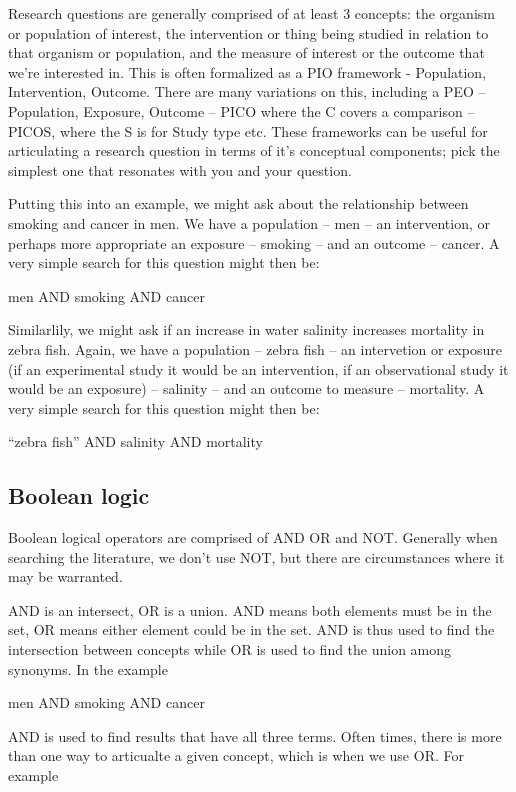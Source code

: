 \documentclass[
]{book}
\begin{document}
Research questions are generally comprised of at least 3 concepts: the organism or population of interest, the intervention or thing being studied in relation to that organism or population, and the measure of interest or the outcome that we're interested in. This is often formalized as a PIO framework - Population, Intervention, Outcome. There are many variations on this, including a PEO -- Population, Exposure, Outcome -- PICO where the C covers a comparison -- PICOS, where the S is for Study type etc. These frameworks can be useful for articulating a research question in terms of it's conceptual components; pick the simplest one that resonates with you and your question.

Putting this into an example, we might ask about the relationship between smoking and cancer in men. We have a population -- men -- an intervention, or perhaps more appropriate an exposure -- smoking -- and an outcome -- cancer. A very simple search for this question might then be:

men AND smoking AND cancer

Similarlily, we might ask if an increase in water salinity increases mortality in zebra fish. Again, we have a population -- zebra fish -- an intervetion or exposure (if an experimental study it would be an intervention, if an observational study it would be an exposure) -- salinity -- and an outcome to measure -- mortality. A very simple search for this question might then be:

``zebra fish'' AND salinity AND mortality

\hypertarget{boolean-logic}{%
\subsection{Boolean logic}\label{boolean-logic}}

Boolean logical operators are comprised of AND OR and NOT. Generally when searching the literature, we don't use NOT, but there are circumstances where it may be warranted.

AND is an intersect, OR is a union. AND means both elements must be in the set, OR means either element could be in the set. AND is thus used to find the intersection between concepts while OR is used to find the union among synonyms. In the example

men AND smoking AND cancer

AND is used to find results that have all three terms. Often times, there is more than one way to articualte a given concept, which is when we use OR. For example
\end{document}
